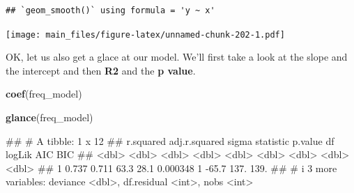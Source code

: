 \documentclass[
]{book}
\newenvironment{Shaded}{\begin{snugshade}}{\end{snugshade}}
\newcommand{\FunctionTok}[1]{\textcolor[rgb]{0.13,0.29,0.53}{\textbf{#1}}}
\newcommand{\NormalTok}[1]{#1}
\newcommand{\OtherTok}[1]{\textcolor[rgb]{0.56,0.35,0.01}{#1}}
\newcommand{\SpecialCharTok}[1]{\textcolor[rgb]{0.81,0.36,0.00}{\textbf{#1}}}
\begin{document}
\begin{verbatim}
## `geom_smooth()` using formula = 'y ~ x'
\end{verbatim}

\texttt{[image: main\_files/figure-latex/unnamed-chunk-202-1.pdf]}

\begin{Shaded}
\end{Shaded}

OK, let us also get a glace at our model. We'll first take a look at the slope and the intercept and then \textbf{R2} and the \textbf{p value}.

\begin{Shaded}
\begin{Highlighting}[]
\FunctionTok{coef}\NormalTok{(freq\_model)}
\end{Highlighting}
\end{Shaded}

\begin{Shaded}
\end{Shaded}

\begin{Shaded}
\begin{Highlighting}[]
\FunctionTok{glance}\NormalTok{(freq\_model)}
\end{Highlighting}
\end{Shaded}

\begin{Shaded}
\begin{Highlighting}[]
\NormalTok{\#\# \# A tibble: 1 x 12}
\NormalTok{\#\#   r.squared adj.r.squared sigma statistic  p.value    df logLik   AIC   BIC}
\NormalTok{\#\#       \textless{}dbl\textgreater{}         \textless{}dbl\textgreater{} \textless{}dbl\textgreater{}     \textless{}dbl\textgreater{}    \textless{}dbl\textgreater{} \textless{}dbl\textgreater{}  \textless{}dbl\textgreater{} \textless{}dbl\textgreater{} \textless{}dbl\textgreater{}}
\NormalTok{\#\# 1     0.737         0.711  63.3      28.1 0.000348     1  {-}65.7  137.  139.}
\NormalTok{\#\# \# i 3 more variables: deviance \textless{}dbl\textgreater{}, df.residual \textless{}int\textgreater{}, nobs \textless{}int\textgreater{}}
\end{Highlighting}
\end{Shaded}
\end{document}
